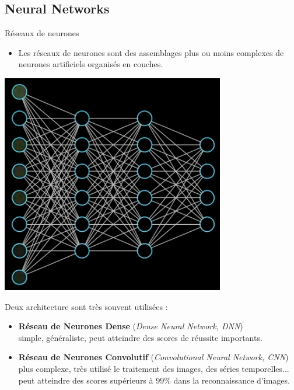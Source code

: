 \documentclass[10pt,serif,mathserif,compress,hyperref={colorlinks}]{beamer}
\begin{document}
\subsection{Neural Networks}

\begin{frame}{Réseaux de neurones}

  \begin{minipage}{.6\textwidth}
    \begin{itemize}
    \item Les réseaux de neurones sont des assemblages plus ou moins complexes de neurones artificiels organisés en couches.
    \end{itemize}
  \end{minipage}\begin{minipage}{.4\textwidth}
    \vspace*{-6mm}\includegraphics[width=\textwidth]{images/RN.png}
  \end{minipage}
  
  Deux architecture sont très souvent utilisées :
  \begin{itemize}
    \item \textbf{Réseau de Neurones Dense} ({\em Dense Neural Network, DNN})\\
      simple, généraliste, peut atteindre des scores de réussite importants.
    \item \textbf{Réseau de Neurones Convolutif} ({\em Convolutional Neural Network, CNN})\\
      plus complexe, très utilisé le traitement des images, des séries temporelles...
      peut atteindre des scores supérieurs à 99\% dans la reconnaissance d'images.
  \end{itemize}
  
\end{frame}
\end{document}
